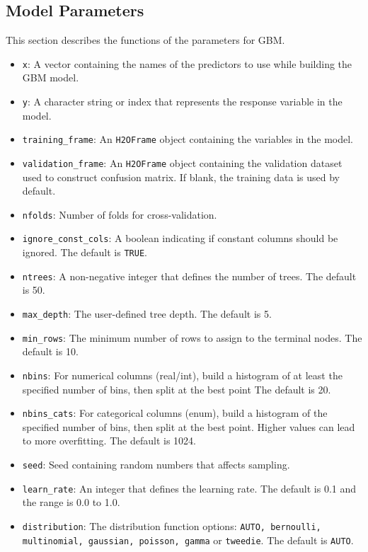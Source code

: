 \subsection{ Model Parameters}
\label{ssec:Model Parameters}
This section describes the functions of the parameters for GBM. 
\begin{itemize}
\item {\texttt{x}}: A vector containing the names of the predictors to use while building the GBM model. 
\item {\texttt{y}}: A character string or index that represents the response variable in the model.  
\item {\texttt{training\_frame}}: An \texttt{H2OFrame} object containing the variables in the model. 
\item {\texttt{validation\_frame}}: An \texttt{H2OFrame} object containing the validation dataset used to construct confusion matrix. If  blank, the training data is used by default.
\item {\texttt{nfolds}}: Number of folds for cross-validation. 
\item {\texttt{ignore\_const\_cols}}: A boolean indicating if constant columns should be ignored.  The default is  {\texttt{TRUE}}.
\item {\texttt{ntrees}}: A non-negative integer that defines the number of trees. The default is 50.
\item {\texttt{max\_depth}}: The user-defined tree depth. The default is 5.
\item {\texttt{min\_rows}}: The minimum number of rows to assign to the terminal nodes. The default is 10.
\item {\texttt{nbins}}: For numerical columns (real/int), build a histogram of at least the specified number of bins, then split at the best point The default is 20.
\item {\texttt{nbins\_cats}}: For categorical columns (enum), build a histogram of the specified number of bins, then split at the best point. Higher values can lead to more overfitting.  The default is 1024. \label{nbins_cats}
\item {\texttt{seed}}: Seed containing random numbers that affects sampling.
\item {\texttt{learn\_rate}}: An integer that defines the learning rate. The default is 0.1 and the range is 0.0 to 1.0.
\item {\texttt{distribution}}: The distribution function options: {\texttt{AUTO, bernoulli, multinomial, gaussian, poisson, gamma}} or {\texttt{tweedie}}. The default is {\texttt{AUTO}}.

\end{itemize}

